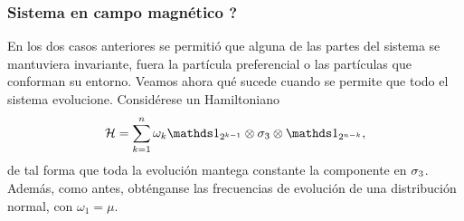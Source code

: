 \subsubsection{Sistema en campo magnético ?}


En los dos casos anteriores se permitió que alguna de las partes del sistema se mantuviera invariante, fuera la partícula preferencial  o las partículas que conforman su entorno. Veamos ahora qué sucede cuando se permite que todo el sistema evolucione. Considérese un Hamiltoniano
\begin{equation*}
    \mcH=\sum_{k=1}^{n}\omega_{k}\Id_{2^{k-1}}\otimes \pauli{3} \otimes \Id_{2^{n-k}},
\end{equation*}
de tal forma que toda la evolución mantega constante la componente en $\sigma_{3}$. Además, como antes, obténganse las frecuencias de evolución de una distribución normal, con $\omega_{1}=\mu$.

